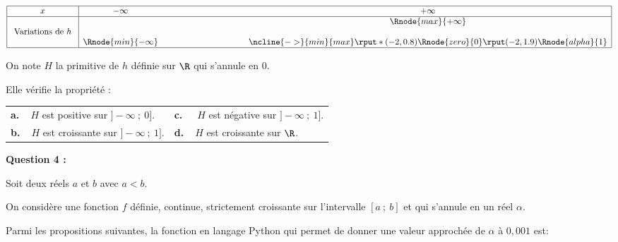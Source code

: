 \begin{center}
{\renewcommand{\arraystretch}{1.3}
\def\esp{\hspace*{3cm}}
$\begin{array}{|c| *3{c}|}
\hline
 x & -\infty   & \esp & +\infty \\
 \hline
  &   &    & \Rnode{max}{+\infty}   \\
\text{ Variations de $h$ } & &  &  \\
 &     \Rnode{min}{-\infty} & & 
\ncline{->}{min}{max}
\rput*(-2,0.8){\Rnode{zero}{0}}
\rput(-2,1.9){\Rnode{alpha}{1}}
\\
\hline
\end{array}$
}
\end{center}

On note $H$ la primitive de $h$ définie sur $\R$ qui s'annule en $0$.

Elle vérifie la propriété :

\begin{tabularx}{\linewidth}{X X}
\textbf{a.~~}$H$ est positive sur $]-\infty~;~0]$.& \textbf{c.~~} $H$ est négative sur $]-\infty~;~1]$.\\
\textbf{b.~~}$H$ est croissante sur $]-\infty~;~1]$.& \textbf{d.~~}$H$ est croissante sur $\R$.
\end{tabularx}


\textbf{Question 4 :}

\medskip

Soit deux réels $a$ et $b$ avec $a < b$.

On considère une fonction $f$ définie, continue, strictement croissante sur l'intervalle
$[a~;~b]$ et qui s'annule en un réel $\alpha$.

Parmi les propositions suivantes, la fonction en langage Python qui permet de donner
une valeur approchée de $\alpha$ à $0,001$ est:

\smallskip

